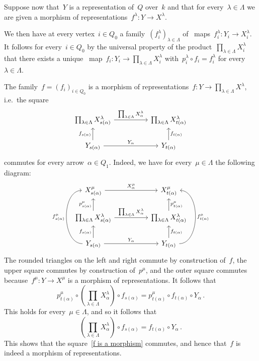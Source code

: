 Suppose now that~$Y$ is a representation of~$Q$ over~$k$ and that for every~$\lambda \in \Lambda$ we are given a morphism of representations~$f^\lambda \colon Y \to X^\lambda$.

We then have at every vertex~$i \in Q_0$ a family~$(f^\lambda_i)_{\lambda \in \Lambda}$ of~{\klin} maps~$f^\lambda_i \colon Y_i \to X^\lambda_i$.
It follows for every~$i \in Q_0$ by the universal property of the product~$\prod_{\lambda \in \Lambda} X^\lambda_i$ that there exists a unique~{\klin} map~$f_i \colon Y_i \to \prod_{\lambda \in \Lambda} X^\lambda_i$ with~$p^\lambda_i \circ f_i = f^\lambda_i$ for every~$\lambda \in \Lambda$.

The family~$f = (f_i)_{i \in Q_0}$ is a morphism of representations~$f \colon Y \to \prod_{\lambda \in \Lambda} X^\lambda$, i.e.\ the square
\begin{equation}
  \label{f is a morphism}
  \begin{tikzcd}[column sep = huge]
      \prod_{\lambda \in \Lambda} X^\lambda_{s(\alpha)}
      \arrow{r}[above]{\prod_{\lambda \in \Lambda} X^\lambda_\alpha}
    & \prod_{\lambda \in \Lambda} X^\lambda_{t(\alpha)}
    \\
      Y_{s(\alpha)}
      \arrow{u}[left]{f_{s(\alpha)}}
      \arrow{r}[above]{Y_\alpha}
    & Y_{t(\alpha)}
      \arrow{u}[right]{f_{t(\alpha)}}
  \end{tikzcd}
\end{equation}
commutes for every arrow~$\alpha \in Q_1$.
Indeed, we have for every~$\mu \in \Lambda$ the following diagram:
\[
  \begin{tikzcd}[column sep = huge]
      X^\mu_{s(\alpha)}
      \arrow{r}[above]{X^\mu_\alpha}
    & X^\mu_{t(\alpha)}
    \\
      \prod_{\lambda \in \Lambda} X^\lambda_{s(\alpha)}
      \arrow{u}[left]{p^\mu_{s(\alpha)}}
      \arrow{r}[above]{\prod_{\lambda \in \Lambda} X^\lambda_\alpha}
    & \prod_{\lambda \in \Lambda} X^\lambda_{t(\alpha)}
      \arrow{u}[right]{p^\mu_{t(\alpha)}}
    \\
      Y_{s(\alpha)}
      \arrow[bend left = 90]{uu}[left]{f^\mu_{s(\alpha)}}
      \arrow{u}[left]{f_{s(\alpha)}}
      \arrow{r}[above]{Y_\alpha}
    & Y_{t(\alpha)}
      \arrow[bend right = 90]{uu}[right]{f^\mu_{t(\alpha)}}
      \arrow{u}[right]{f_{t(\alpha)}}
  \end{tikzcd}
\]
The rounded triangles on the left and right commute by construction of~$f$, the upper square commutes by construction of~$p^\mu$, and the outer square commutes because~$f^\mu \colon Y \to X^\mu$ is a morphism of representations.
It follows that
\[
          p^\mu_{t(\alpha)}
    \circ \left( \prod_{\lambda \in \Lambda} X^\lambda_\alpha \right)
    \circ f_{s(\alpha)}
  =       p^\mu_{t(\alpha)}
    \circ f_{t(\alpha)}
    \circ Y_\alpha \,.
\]
This holds for every~$\mu \in \Lambda$, and so it follows that
\[
          \left( \prod_{\lambda \in \Lambda} X^\lambda_\alpha \right)
    \circ f_{s(\alpha)}
  = f_{t(\alpha)} \circ Y_\alpha \,.
\]
This shows that the square~\eqref{f is a morphism} commutes, and hence that~$f$ is indeed a morphism of representations.

